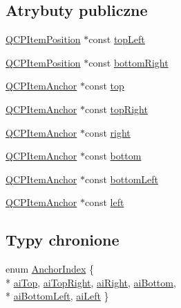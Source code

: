 \subsection*{Atrybuty publiczne}
\begin{DoxyCompactItemize}
\item 
\hyperlink{class_q_c_p_item_position}{Q\+C\+P\+Item\+Position} $\ast$const \hyperlink{class_q_c_p_item_pixmap_a43c281ef6ad46f3cf04f365289abe51a}{top\+Left}
\item 
\hyperlink{class_q_c_p_item_position}{Q\+C\+P\+Item\+Position} $\ast$const \hyperlink{class_q_c_p_item_pixmap_abcc38063f9502b876bf6615c45cc0994}{bottom\+Right}
\item 
\hyperlink{class_q_c_p_item_anchor}{Q\+C\+P\+Item\+Anchor} $\ast$const \hyperlink{class_q_c_p_item_pixmap_af7a156590b1d59ab21b453c430c56a7c}{top}
\item 
\hyperlink{class_q_c_p_item_anchor}{Q\+C\+P\+Item\+Anchor} $\ast$const \hyperlink{class_q_c_p_item_pixmap_a72eabd0010be41a4ec1b22aa983d2aa1}{top\+Right}
\item 
\hyperlink{class_q_c_p_item_anchor}{Q\+C\+P\+Item\+Anchor} $\ast$const \hyperlink{class_q_c_p_item_pixmap_ac9c0fd231f9e285765978a05d13f8280}{right}
\item 
\hyperlink{class_q_c_p_item_anchor}{Q\+C\+P\+Item\+Anchor} $\ast$const \hyperlink{class_q_c_p_item_pixmap_ad7da77f530868e846151eff8a28fb948}{bottom}
\item 
\hyperlink{class_q_c_p_item_anchor}{Q\+C\+P\+Item\+Anchor} $\ast$const \hyperlink{class_q_c_p_item_pixmap_a01943e569233382b3627e24636b0fff2}{bottom\+Left}
\item 
\hyperlink{class_q_c_p_item_anchor}{Q\+C\+P\+Item\+Anchor} $\ast$const \hyperlink{class_q_c_p_item_pixmap_a8c85fcb8cb8ce292859a0499d16539b1}{left}
\end{DoxyCompactItemize}
\subsection*{Typy chronione}
\begin{DoxyCompactItemize}
\item 
enum \hyperlink{class_q_c_p_item_pixmap_a0ea7f65edb7395e02de521915f221174}{Anchor\+Index} \{ \\*
\hyperlink{class_q_c_p_item_pixmap_a0ea7f65edb7395e02de521915f221174a90e523ebaed7921ca90cf1b08944ece5}{ai\+Top}, 
\hyperlink{class_q_c_p_item_pixmap_a0ea7f65edb7395e02de521915f221174a33c256cdec46fa1587534fcd6e776799}{ai\+Top\+Right}, 
\hyperlink{class_q_c_p_item_pixmap_a0ea7f65edb7395e02de521915f221174ab22d91dae59c0d4a65416a0d677b2d05}{ai\+Right}, 
\hyperlink{class_q_c_p_item_pixmap_a0ea7f65edb7395e02de521915f221174a04b5e041b4dd0def2b60c5cfea2bc1a4}{ai\+Bottom}, 
\\*
\hyperlink{class_q_c_p_item_pixmap_a0ea7f65edb7395e02de521915f221174ae14886b381136898e37e89af5046a1cc}{ai\+Bottom\+Left}, 
\hyperlink{class_q_c_p_item_pixmap_a0ea7f65edb7395e02de521915f221174a9efe71239b9409ebe1c2813a37807f2a}{ai\+Left}
 \}
\end{DoxyCompactItemize}
